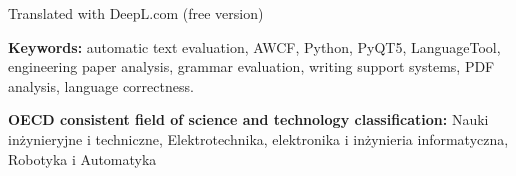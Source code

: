 Translated with DeepL.com (free version)

\bigskip

\noindent\textbf{Keywords:} automatic text evaluation, AWCF, Python, PyQT5, LanguageTool, engineering paper analysis, grammar evaluation, writing support systems, PDF analysis, language correctness.

\bigskip

\noindent\textbf{OECD consistent field of science and technology classification:} Nauki inżynieryjne i techniczne, Elektrotechnika, elektronika i inżynieria informatyczna, Robotyka i Automatyka
